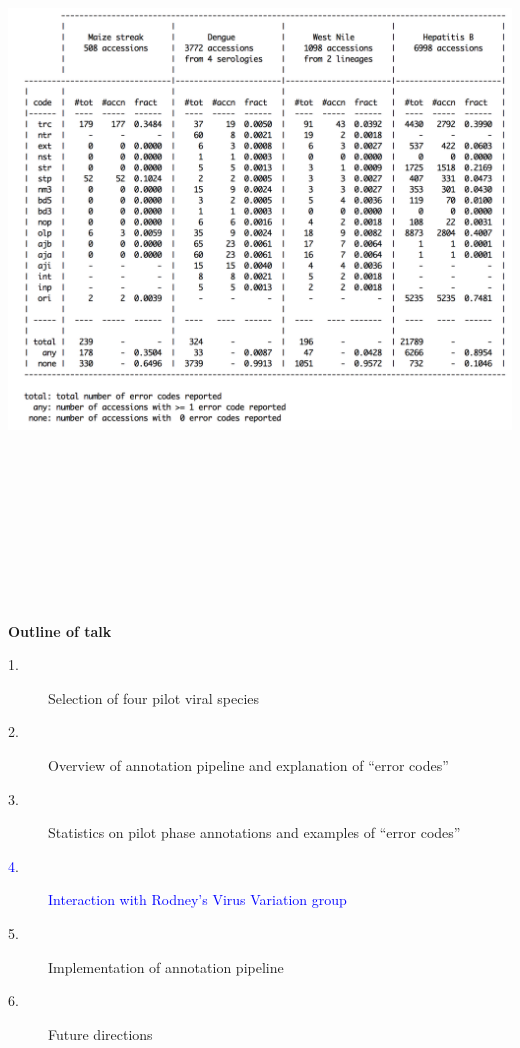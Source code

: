 \documentclass[landscape]{slides}
\begin{document}
\begin{slide}
\begin{center}
\includegraphics[height=8in]{figs/pilot-errcode-table-4}
\vfill
\end{center}
\end{slide}
\begin{slide}
\begin{center}
\textbf{Outline of talk}

\small
\begin{description}
\item[1.] Selection of four pilot viral species
\item[2.] Overview of annotation pipeline and explanation of ``error codes''
\item[3.] Statistics on pilot phase annotations and examples of ``error codes''
\item[\textcolor{blue}4.] \textcolor{blue}{Interaction with Rodney's Virus Variation group}
\item[5.] Implementation of annotation pipeline
\item[6.] Future directions
\end{description}

\end{center}
\vfill
\end{slide}
\end{document}
